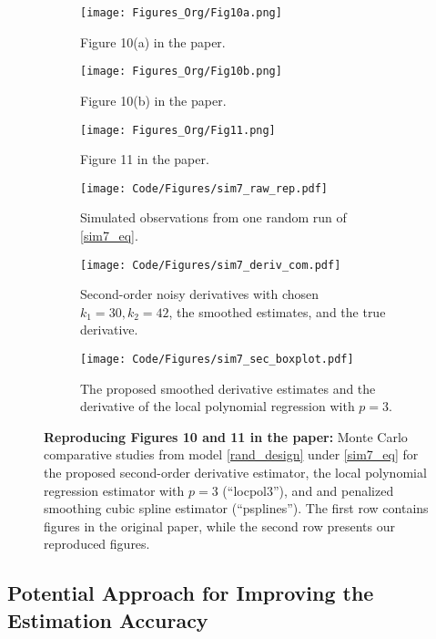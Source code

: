 \documentclass{uwstat572}
\theoremstyle{definition}
\theoremstyle{theorem}
\begin{document}
\begin{figure}[!t]
	\captionsetup[subfigure]{justification=centering}
	\begin{subfigure}[t]{0.32\linewidth}
		\centering
		\texttt{[image: Figures\_Org/Fig10a.png]}
		\caption{Figure 10(a) in the paper.}
	\end{subfigure}
	\hfil
	\begin{subfigure}[t]{0.32\linewidth}
		\centering
		\texttt{[image: Figures\_Org/Fig10b.png]}
		\caption{Figure 10(b) in the paper.}
	\end{subfigure}
	\hfil
	\begin{subfigure}[t]{0.32\linewidth}
		\centering
		\texttt{[image: Figures\_Org/Fig11.png]}
		\caption{Figure 11 in the paper.}
	\end{subfigure}
	\begin{subfigure}[t]{0.32\linewidth}
		\centering
		\texttt{[image: Code/Figures/sim7\_raw\_rep.pdf]}
		\caption{Simulated observations from one random run of \eqref{sim7_eq}.}
	\end{subfigure}
	\hfil
	\begin{subfigure}[t]{0.32\linewidth}
		\centering
		\texttt{[image: Code/Figures/sim7\_deriv\_com.pdf]}
		\caption{Second-order noisy derivatives with chosen $k_1=30, k_2=42$, the smoothed estimates, and the true derivative.}
	\end{subfigure}
	\hfil
	\begin{subfigure}[t]{0.32\linewidth}
		\centering
		\texttt{[image: Code/Figures/sim7\_sec\_boxplot.pdf]}
		\caption{The proposed smoothed derivative estimates and the derivative of the local polynomial regression with $p=3$.}
	\end{subfigure}
	\caption{{\bf Reproducing Figures 10 and 11 in the paper:} Monte Carlo comparative studies from model \eqref{rand_design} under \eqref{sim7_eq} for the proposed second-order derivative estimator, the local polynomial regression estimator with $p=3$ (``locpol3''), and and penalized smoothing cubic spline estimator (``psplines''). The first row contains figures in the original paper, while the second row presents our reproduced figures.}
	\label{fig:sim7_rep}
\end{figure}

\subsection{Potential Approach for Improving the Estimation Accuracy}
\label{App:poten_improve}
\end{document}
